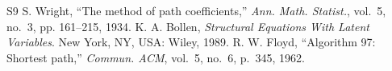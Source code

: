 \documentclass[journal]{IEEEtran}
\begin{document}
\begin{thebibliography}{S9}
 S. Wright, ``The method of path coefficients,'' \emph{Ann. Math. Statist.}, vol.~5, no.~3, pp. 161--215, 1934.
 K. A. Bollen, \emph{Structural Equations With Latent Variables}. New York, NY, USA: Wiley, 1989.
 R. W. Floyd, ``Algorithm 97: Shortest path,'' \emph{Commun. ACM}, vol.~5, no.~6, p.~345, 1962.
\end{thebibliography}
\end{document}
